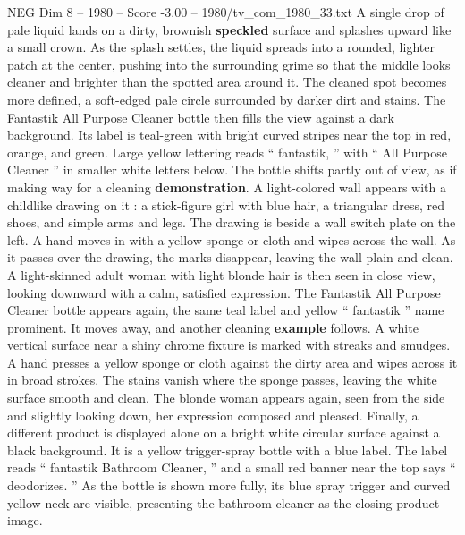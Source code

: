 \begin{textsample}{NEG Dim 8 – 1980 – Score -3.00 – 1980/tv\_com\_1980\_33.txt}  \label{ex:f8_neg_053}
A single drop of pale liquid lands on a dirty, brownish \textbf{speckled} surface and splashes upward like a small crown.
As the splash settles, the liquid spreads into a rounded, lighter patch at the center, pushing into the surrounding grime so that the middle looks cleaner and brighter than the spotted area around it.
The cleaned spot becomes more defined, a soft-edged pale circle surrounded by darker dirt and stains.
The Fantastik All Purpose Cleaner bottle then fills the view against a dark background.
Its label is teal-green with bright curved stripes near the top in red, orange, and green.
Large yellow lettering reads “ fantastik, ” with “ All Purpose Cleaner ” in smaller white letters below.
The bottle shifts partly out of view, as if making way for a cleaning \textbf{demonstration}.
A light-colored wall appears with a childlike drawing on it : a stick-figure girl with blue hair, a triangular dress, red shoes, and simple arms and legs.
The drawing is beside a wall switch plate on the left.
A hand moves in with a yellow sponge or cloth and wipes across the wall.
As it passes over the drawing, the marks disappear, leaving the wall plain and clean.
A light-skinned adult woman with light blonde hair is then seen in close view, looking downward with a calm, satisfied expression.
The Fantastik All Purpose Cleaner bottle appears again, the same teal label and yellow “ fantastik ” name prominent.
It moves away, and another cleaning \textbf{example} follows.
A white vertical surface near a shiny chrome fixture is marked with streaks and smudges.
A hand presses a yellow sponge or cloth against the dirty area and wipes across it in broad strokes.
The stains vanish where the sponge passes, leaving the white surface smooth and clean.
The blonde woman appears again, seen from the side and slightly looking down, her expression composed and pleased.
Finally, a different product is displayed alone on a bright white circular surface against a black background.
It is a yellow trigger-spray bottle with a blue label.
The label reads “ fantastik Bathroom Cleaner, ” and a small red banner near the top says “ deodorizes. ” As the bottle is shown more fully, its blue spray trigger and curved yellow neck are visible, presenting the bathroom cleaner as the closing product image.

\end{textsample}
